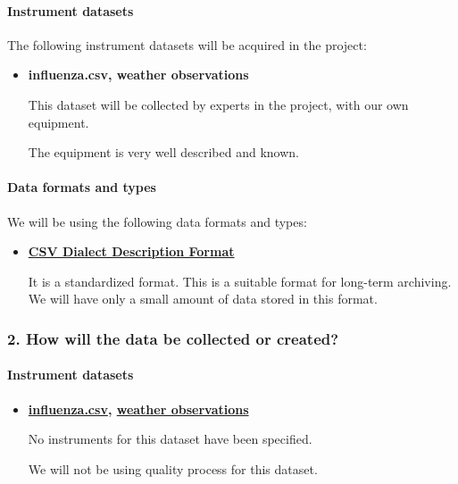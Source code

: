 \documentclass[
]{article}
\begin{document}
\hypertarget{instrument-datasets}{%
\paragraph{Instrument datasets}\label{instrument-datasets}}

The following instrument datasets will be acquired in the project:

\begin{itemize}
\item
  \textbf{influenza.csv, weather observations}

  This dataset will be collected by experts in the project, with our own
  equipment.

  The equipment is very well described and known.
\end{itemize}

\hypertarget{data-formats-and-types}{%
\paragraph{Data formats and types}\label{data-formats-and-types}}

We will be using the following data formats and types:

\begin{itemize}
\item
  \textbf{\href{https://fairsharing.org/bsg-s001303}{CSV Dialect
  Description Format}}

  It is a standardized format. This is a suitable format for long-term
  archiving. We will have only a small amount of data stored in this
  format.
\end{itemize}

\hypertarget{q-how-data}{}
\hypertarget{how-will-the-data-be-collected-or-created}{%
\subsubsection{2. How will the data be collected or
created?}\label{how-will-the-data-be-collected-or-created}}

\hypertarget{instrument-datasets-1}{%
\paragraph{Instrument datasets}\label{instrument-datasets-1}}

\begin{itemize}
\item
  \textbf{\href{https://www.data.gv.at/katalog/dataset/grippemeldedienst-stadt-wien}{influenza.csv}, \href{https://www.meteoblue.com/en/weather/archive/export/vienna_austria_2761369}{weather observations}}

  No instruments for this dataset have been specified.

  We will not be using quality process for this dataset.
\end{itemize}
\end{document}
